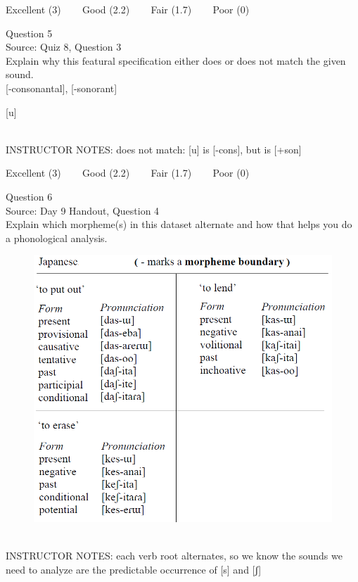 \documentclass[12pt]{article}
\begin{document}
\vfill
Excellent (3) ~~~ Good (2.2) ~~~ Fair (1.7) ~~~ Poor (0)
\newpage

{\large Question 5}\\

Source: Quiz 8, Question 3\\

Explain why this featural specification either does or does not match the given sound.\\

{[-consonantal]}, {[-sonorant]}

{[u]}


~\\
INSTRUCTOR NOTES: does not match: [u] is [-cons], but is [+son]


\vfill
Excellent (3) ~~~ Good (2.2) ~~~ Fair (1.7) ~~~ Poor (0)
\newpage

{\large Question 6}\\

Source: Day 9 Handout, Question 4\\

Explain which morpheme(s) in this dataset alternate and how that helps you do a phonological analysis.\\

\begin{figure}[H]
\includegraphics{../images/japanese_verbs.png}
\end{figure}

~\\
INSTRUCTOR NOTES: each verb root alternates, so we know the sounds we need to analyze are the predictable occurrence of [s] and [ʃ]
\end{document}
